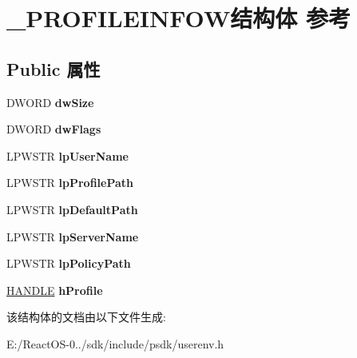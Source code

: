 \hypertarget{struct___p_r_o_f_i_l_e_i_n_f_o_w}{}\section{\+\_\+\+P\+R\+O\+F\+I\+L\+E\+I\+N\+F\+O\+W结构体 参考}
\label{struct___p_r_o_f_i_l_e_i_n_f_o_w}
\subsection*{Public 属性}
\begin{DoxyCompactItemize}
\item 
\mbox{\label{struct___p_r_o_f_i_l_e_i_n_f_o_w_a6683523fb3c75cddcbf676daadcb42ac}} 
D\+W\+O\+RD {\bfseries dw\+Size}
\item 
\mbox{\label{struct___p_r_o_f_i_l_e_i_n_f_o_w_a6515ab99917c13a0bf02d46a589c8bae}} 
D\+W\+O\+RD {\bfseries dw\+Flags}
\item 
\mbox{\label{struct___p_r_o_f_i_l_e_i_n_f_o_w_a85ca89013fbf2cd58406bb35b9be6e5c}} 
L\+P\+W\+S\+TR {\bfseries lp\+User\+Name}
\item 
\mbox{\label{struct___p_r_o_f_i_l_e_i_n_f_o_w_a6046ac4d276b8841b5bbcd0ad59cbf11}} 
L\+P\+W\+S\+TR {\bfseries lp\+Profile\+Path}
\item 
\mbox{\label{struct___p_r_o_f_i_l_e_i_n_f_o_w_ac130807cfe8ff2e788adc9d64a238047}} 
L\+P\+W\+S\+TR {\bfseries lp\+Default\+Path}
\item 
\mbox{\label{struct___p_r_o_f_i_l_e_i_n_f_o_w_a267f5b0afcc23006ce0cade766a5a064}} 
L\+P\+W\+S\+TR {\bfseries lp\+Server\+Name}
\item 
\mbox{\label{struct___p_r_o_f_i_l_e_i_n_f_o_w_a0359b392806c11dd5abc5ea16c85f749}} 
L\+P\+W\+S\+TR {\bfseries lp\+Policy\+Path}
\item 
\mbox{\label{struct___p_r_o_f_i_l_e_i_n_f_o_w_a7c5a6a29605a0f9f5250d9cbdcf5d0ba}} 
\hyperlink{interfacevoid}{H\+A\+N\+D\+LE} {\bfseries h\+Profile}
\end{DoxyCompactItemize}


该结构体的文档由以下文件生成\+:\begin{DoxyCompactItemize}
\item 
E\+:/\+React\+O\+S-\/0../sdk/include/psdk/userenv.\+h\end{DoxyCompactItemize}
